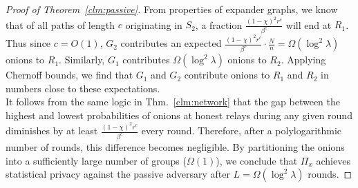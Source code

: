 \begin{proof} [Proof of Theorem~\ref{clm:passive}]
From properties of expander graphs, we know that of all paths of length $c$ originating in $S_2$, a fraction $\frac{(1 - \chi)^2 r^c}{\beta^c}$ will end at $R_1$. Thus since $c = O(1)$, $G_2$ contributes an expected $\frac{(1 - \chi)^2 r^{c}}{\beta^{c}} \cdot \frac{N}{n} = \Omega(\log^2 \lambda)$ onions to $R_1$. Similarly, $G_1$ contributes $\Omega(\log^2 \lambda)$ onions to $R_2$. Applying Chernoff bounds, we find that $G_1$ and $G_2$ contribute onions to $R_1$ and $R_2$ in numbers close to these expectations. \\

It follows from the same logic in Thm.~\ref{clm:network} that the gap between the highest and lowest probabilities of onions at honest relays during any given round diminishes by at least $\frac{(1 - \chi)^2 r^{c}}{\beta^{c}}$ every round. Therefore, after a polylogarithmic number of rounds, this difference becomes negligible. By partitioning the onions into a sufficiently large number of groups ($\Omega(1)$), we conclude that $\Pi_x$ achieves statistical privacy against the passive adversary after $L = \Omega(\log^2 \lambda)$ rounds.
    
\end{proof}


    
        
    
